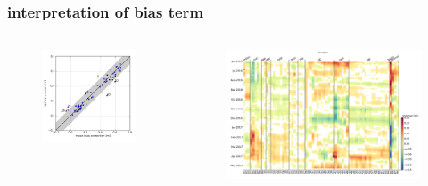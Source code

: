 \begin{frame}
\frametitle{interpretation of bias term}
\begin{columns}
    \begin{column}{0.4\textwidth}
      \begin{figure}      
        \includegraphics[width=\textwidth]{figures/plots/aggSL_bias_breakdown_plot_1.png}
      \end{figure}
    \end{column}

    \begin{column}{0.6\textwidth}
      \begin{figure}      
        \includegraphics[width=\textwidth]{figures/plots/aggSL_bias_breakdown_plot_2.png}
      \end{figure}
    \end{column}
\end{columns}
\end{frame}
